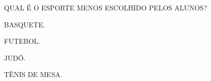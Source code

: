 QUAL É O ESPORTE MENOS ESCOLHIDO PELOS ALUNOS?

\begin{escolha}
\item BASQUETE.

\item FUTEBOL.

\item JUDÔ.

\item TÊNIS DE MESA.
\end{escolha}

\pagebreak